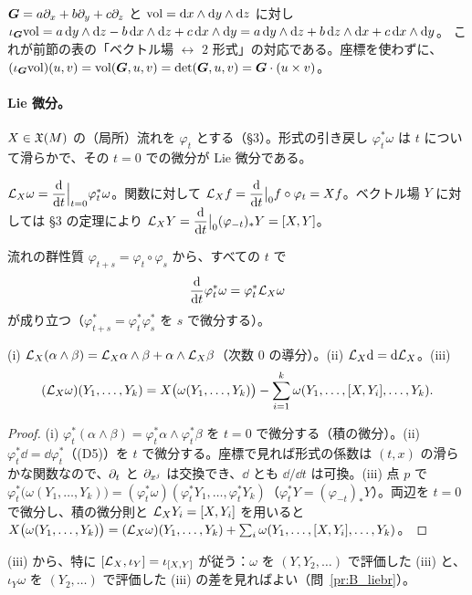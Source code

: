 \begin{ex}[$\R^3$：流束の形式]\label{B:ex:iotavol}
$\boldsymbol G=a\partial_x+b\partial_y+c\partial_z$ と $\mathrm{vol}=\mathrm{d} x\wedge\mathrm{d} y\wedge\mathrm{d} z$ に対し
$\iota_{\boldsymbol G}\mathrm{vol}=a\,\mathrm{d} y\wedge\mathrm{d} z-b\,\mathrm{d} x\wedge\mathrm{d} z+c\,\mathrm{d} x\wedge\mathrm{d} y=a\,\mathrm{d} y\wedge\mathrm{d} z+b\,\mathrm{d} z\wedge\mathrm{d} x+c\,\mathrm{d} x\wedge\mathrm{d} y$。
これが前節の表の「ベクトル場 $\leftrightarrow$ $2$ 形式」の対応である。座標を使わずに、$(\iota_{\boldsymbol G}\mathrm{vol})(u,v)=\mathrm{vol}(\boldsymbol G,u,v)=\det(\boldsymbol G,u,v)=\boldsymbol G\cdot(u\times v)$。
\end{ex}

\paragraph{Lie 微分。}$X\in\mathfrak X(M)$ の（局所）流れを $\varphi_t$ とする（§3）。形式の引き戻し $\varphi_t^*\omega$ は $t$ について滑らかで、その $t=0$ での微分が Lie 微分である。
\begin{defn}[Lie 微分]
$\mathcal L_X\omega=\dfrac{\mathrm{d}}{\mathrm{d} t}\Big|_{t=0}\varphi_t^*\omega$。関数に対して $\mathcal L_Xf=\dfrac{\mathrm{d}}{\mathrm{d} t}\big|_0f\circ\varphi_t=Xf$。ベクトル場 $Y$ に対しては §3 の定理により $\mathcal L_XY=\dfrac{\mathrm{d}}{\mathrm{d} t}\big|_0(\varphi_{-t})_*Y=[X,Y]$。
\end{defn}
流れの群性質 $\varphi_{t+s}=\varphi_t\circ\varphi_s$ から、すべての $t$ で
\begin{equation}\label{B:eq:flowderiv}
\frac{\mathrm{d}}{\mathrm{d} t}\varphi_t^*\omega=\varphi_t^*\mathcal L_X\omega
\end{equation}
が成り立つ（$\varphi_{t+s}^*=\varphi_t^*\varphi_s^*$ を $s$ で微分する）。

\begin{lem}\label{B:lem:lie}\tP
(i) $\mathcal L_X(\alpha\wedge\beta)=\mathcal L_X\alpha\wedge\beta+\alpha\wedge\mathcal L_X\beta$（次数 $0$ の導分）。(ii) $\mathcal L_X\mathrm{d}=\mathrm{d}\mathcal L_X$。(iii)
\[
(\mathcal L_X\omega)(Y_1,\dots,Y_k)=X\bigl(\omega(Y_1,\dots,Y_k)\bigr)-\sum_{i=1}^k\omega(Y_1,\dots,[X,Y_i],\dots,Y_k).
\]
\end{lem}
\begin{proof}
(i) $\varphi_t^*(\alpha\wedge\beta)=\varphi_t^*\alpha\wedge\varphi_t^*\beta$ を $t=0$ で微分する（積の微分）。(ii) $\varphi_t^*\dd=\dd\varphi_t^*$（(D5)）を $t$ で微分する。座標で見れば形式の係数は $(t,x)$ の滑らかな関数なので、$\partial_t$ と $\partial_{x^j}$ は交換でき、$\dd$ とも $\dd/\dd t$ は可換。(iii) 点 $p$ で $\varphi_t^*\bigl(\omega(Y_1,\dots,Y_k)\bigr)=(\varphi_t^*\omega)(\varphi_t^*Y_1,\dots,\varphi_t^*Y_k)$（$\varphi_t^*Y=(\varphi_{-t})_*Y$）。両辺を $t=0$ で微分し、積の微分則と $\mathcal L_XY_i=[X,Y_i]$ を用いると
$X\bigl(\omega(Y_1,\dots,Y_k)\bigr)=(\mathcal L_X\omega)(Y_1,\dots,Y_k)+\sum_i\omega(Y_1,\dots,[X,Y_i],\dots,Y_k)$。
\end{proof}
(iii) から、特に $[\mathcal L_X,\iota_Y]=\iota_{[X,Y]}$ が従う：$\omega$ を $(Y,Y_2,\dots)$ で評価した (iii) と、$\iota_Y\omega$ を $(Y_2,\dots)$ で評価した (iii) の差を見ればよい（問~\ref{pr:B_liebr}）。

